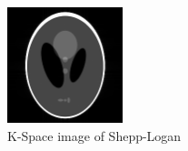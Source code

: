 \documentclass[paper=a4]{scrartcl}
\begin{document}
\begin{figure}[!ht]
    \centerline{\includegraphics[width=0.3\textwidth]{realspace.png}}
    \caption{K-Space image of Shepp-Logan}
    \label{fig:secure_sbatch}
\end{figure}
\end{document}
